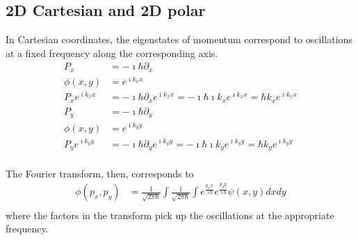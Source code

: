 \documentclass[11pt]{article}
\begin{document}
\subsection{2D Cartesian and 2D polar}

In Cartesian coordinates, the eigenstates of momentum correspond to oscillations at a fixed frequency along the corresponding axis.
\begin{equation}
	\begin{aligned}
		P_x &= - \imath \hbar \partial_x \\
		\phi(x,y) &= e^{\imath k_x x} \\
		P_x e^{\imath k_x x} &= - \imath \hbar \partial_x e^{\imath k_x x} = - \imath \hbar \imath k_x e^{\imath k_x x} = \hbar k_x e^{\imath k_x x} \\ 
		P_y &= - \imath \hbar \partial_y \\
		\phi(x,y) &= e^{\imath k_y y} \\
		P_y e^{\imath k_y y} &= - \imath \hbar \partial_y e^{\imath k_y y} = - \imath \hbar \imath k_y e^{\imath k_y y} = \hbar k_y e^{\imath k_y y} \\ 
	\end{aligned}
\end{equation}

The Fourier transform, then, corresponds to
\begin{equation}
	\begin{aligned}
		\phi(p_x, p_y) &= \frac{1}{\sqrt{2 \pi \hbar}} \int \frac{1}{\sqrt{2 \pi \hbar}} \int e^{\frac{p_x x}{\imath \hbar}} e^{\frac{p_y y}{\imath \hbar}} \psi(x, y) dxdy \\
	\end{aligned}
\end{equation}
where the factors in the transform pick up the oscillations at the appropriate frequency.
\end{document}
